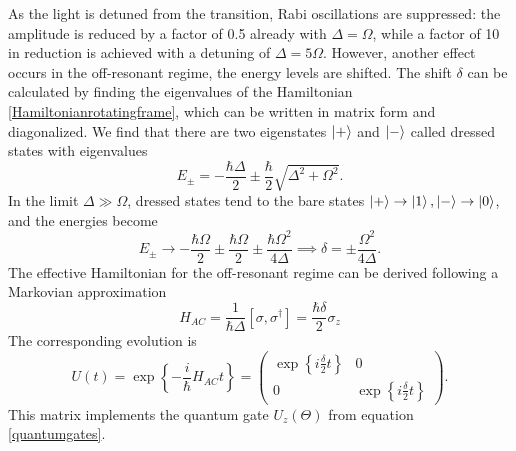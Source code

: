 As the light is detuned from the transition, Rabi oscillations are suppressed: the amplitude is reduced by a factor of 0.5 already with $\Delta = \Omega$, while a factor of 10 in reduction is achieved with a detuning of $\Delta = 5\Omega$. However, another effect occurs in the off-resonant regime, the energy levels are shifted.
The shift $\delta$ can be calculated by finding the eigenvalues of the Hamiltonian \eqref{Hamiltonianrotatingframe}, which can be written in matrix form and diagonalized. We find that there are two eigenstates $\ket{+}$ and $\ket{-}$ called dressed states with eigenvalues
\begin{equation}
E_{\pm} = -\frac{\hbar\Delta}{2} \pm \frac{\hbar}{2}\sqrt{\Delta^2 +\Omega^2}.
\end{equation}
In the limit $\Delta \gg \Omega$, dressed states tend to the bare states $\ket{+} \to \ket{1},\ket{-}\to \ket{0}$, and the energies become
\begin{equation}
\label{eq:starkshift}
E_{\pm} \to -\frac{\hbar \Omega}{2} \pm \frac{\hbar \Omega}{2} \pm \frac{\hbar \Omega^2}{4\Delta} \implies \delta = \pm\frac{\Omega^2}{4\Delta}.
\end{equation}
The effective Hamiltonian for the off-resonant regime can be derived following a Markovian approximation \cite{acstarkhamiltonian}
\begin{equation}
H_{AC} = \frac{1}{\hbar \Delta} [\sigma,\sigma^\dagger] = \frac{\hbar \delta}{2}\sigma_z
\end{equation}
The corresponding evolution is
\begin{equation}
\label{acstarkrotation}
U(t) = \exp\left\{-\frac{i}{\hbar} H_{AC} t \right\} =
 \begin{pmatrix}
   \exp\left\{i\frac{\delta}{2}t\right\} & 0\\
   0 & \exp\left\{i\frac{\delta}{2}t\right\}
\end{pmatrix}.
\end{equation}
This matrix implements the quantum gate $U_z(\Theta)$ from equation \eqref{quantumgates}.


